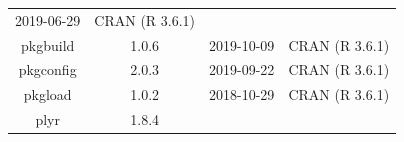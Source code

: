 \documentclass[11pt,]{book}
\begin{document}
\begin{longtable}[]{@{}cccc@{}}
\begin{minipage}[t]{0.16\columnwidth}
2019-06-29\strut
\end{minipage} & \begin{minipage}[t]{0.36\columnwidth}\centering\strut
CRAN (R 3.6.1)\strut
\end{minipage}\tabularnewline
\begin{minipage}[t]{0.18\columnwidth}\centering\strut
pkgbuild\strut
\end{minipage} & \begin{minipage}[t]{0.19\columnwidth}\centering\strut
1.0.6\strut
\end{minipage} & \begin{minipage}[t]{0.16\columnwidth}\centering\strut
2019-10-09\strut
\end{minipage} & \begin{minipage}[t]{0.36\columnwidth}\centering\strut
CRAN (R 3.6.1)\strut
\end{minipage}\tabularnewline
\begin{minipage}[t]{0.18\columnwidth}\centering\strut
pkgconfig\strut
\end{minipage} & \begin{minipage}[t]{0.19\columnwidth}\centering\strut
2.0.3\strut
\end{minipage} & \begin{minipage}[t]{0.16\columnwidth}\centering\strut
2019-09-22\strut
\end{minipage} & \begin{minipage}[t]{0.36\columnwidth}\centering\strut
CRAN (R 3.6.1)\strut
\end{minipage}\tabularnewline
\begin{minipage}[t]{0.18\columnwidth}\centering\strut
pkgload\strut
\end{minipage} & \begin{minipage}[t]{0.19\columnwidth}\centering\strut
1.0.2\strut
\end{minipage} & \begin{minipage}[t]{0.16\columnwidth}\centering\strut
2018-10-29\strut
\end{minipage} & \begin{minipage}[t]{0.36\columnwidth}\centering\strut
CRAN (R 3.6.1)\strut
\end{minipage}\tabularnewline
\begin{minipage}[t]{0.18\columnwidth}\centering\strut
plyr\strut
\end{minipage} & \begin{minipage}[t]{0.19\columnwidth}\centering\strut
1.8.4\strut
\end{minipage} & \begin{minipage}[t]{0.16\columnwidth}\centering\strut

\end{minipage}
\end{longtable}
\end{document}
